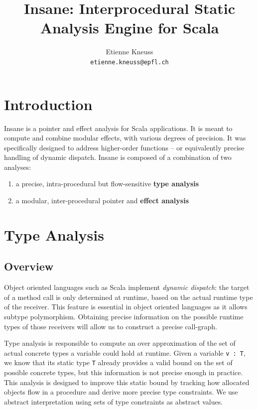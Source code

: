 \documentclass[a4paper]{article}
\author{Etienne Kneuss\\
\texttt{etienne.kneuss@epfl.ch}
}
\title{Insane: Interprocedural Static Analysis Engine for Scala}
\begin{document}
\maketitle
\section{Introduction}
Insane is a pointer and effect analysis for Scala applications. It is meant to
compute and combine modular effects, with various degrees of precision. It was
specifically designed to address higher-order functions -- or equivalently
precise handling of dynamic dispatch. Insane is composed of a combination of
two analyses:

\begin{enumerate}
    \item a precise, intra-procedural but flow-sensitive \textbf{type analysis}
    \item a modular, inter-procedural pointer and \textbf{effect analysis}
\end{enumerate}

\section{Type Analysis}
\subsection{Overview}
Object oriented languages such as Scala implement \emph{dynamic dispatch}: the
target of a method call is only determined at runtime, based on the actual
runtime type of the receiver. This feature is essential in object oriented
languages as it allows subtype polymorphism. Obtaining precise information on
the possible runtime types of those receivers will allow us to construct a
precise call-graph.

Type analysis is responsible to compute an over approximation of the set of
actual concrete types a variable could hold at runtime. Given a variable
\verb=v : T=, we know that its static type \verb=T= already provides a valid
bound on the set of possible concrete types, but this information is not
precise enough in practice. This analysis is designed to improve this static
bound by tracking how allocated objects flow in a procedure and derive more
precise type constraints. We use abstract interpretation using sets of type
constraints as abstract values.
\end{document}
